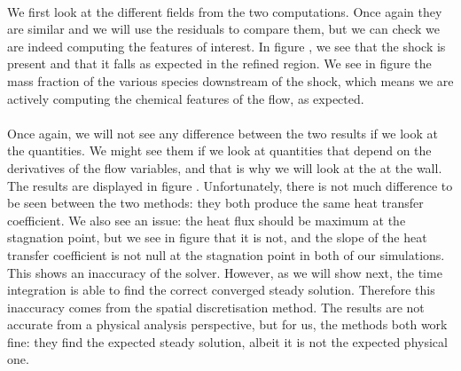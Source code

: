         \paragraph{}
        We first look at the different fields from the two computations.
        Once again they are similar and we will use the residuals to compare them, but we can check we are indeed computing the features of interest.
        In figure , we see that the shock is present and that it falls as expected in the refined region.
        We see in figure  the mass fraction of the various species downstream of the shock, which means we are actively computing the chemical features of the flow, as expected.

        \paragraph{}
        Once again, we will not see any difference between the two results if we look at the  quantities.
        We might see them if we look at quantities that depend on the derivatives of the flow variables, and that is why we will look at the  at the wall.
        The results are displayed in figure .
        Unfortunately, there is not much difference to be seen between the two methods: they both produce the same heat transfer coefficient.
        We also see an issue: the heat flux should be maximum at the stagnation point, but we see in figure  that it is not, and the slope of the heat transfer coefficient is not null at the stagnation point in both of our simulations.
        This shows an inaccuracy of the solver.
        However, as we will show next, the time integration is able to find the correct converged steady solution.
        Therefore this inaccuracy comes from the spatial discretisation method.
        The results are not accurate from a physical analysis perspective, but for us, the methods both work fine: they find the expected steady solution, albeit it is not the expected physical one.

